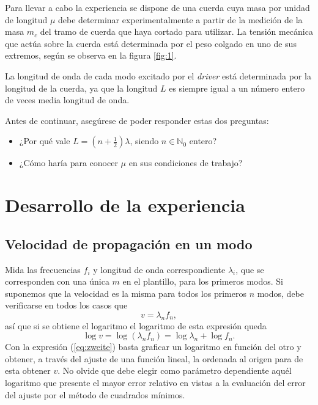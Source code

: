 \documentclass[laboratorio]{guia}
\begin{document}
Para llevar a cabo la experiencia se dispone de una cuerda cuya masa por unidad de longitud \(\mu\) debe determinar experimentalmente a partir de la medición de la masa \(m_c\) del tramo de cuerda que haya cortado para utilizar.
La tensión mecánica que actúa sobre la cuerda está determinada por el peso colgado en uno de sus extremos, según se observa en la figura \ref{fig:1}. 

La longitud de onda de cada modo excitado por el \textit{driver} está determinada por la longitud de la cuerda, ya que la longitud \(L\) es siempre igual a un número entero de veces media longitud de onda.

Antes de continuar, asegúrese de poder responder estas dos preguntas:
\begin{itemize}
    \item ¿Por qué vale \(L = (n+\frac{1}{2}) \lambda\), siendo \(n \in \mathbb{N}_0\) entero? 
    \item ¿Cómo haría para conocer \(\mu\) en sus condiciones de trabajo?
\end{itemize}



\section{Desarrollo de la experiencia}

\subsection{Velocidad de propagación en un modo}
Mida las frecuencias \(f_i\) y longitud de onda correspondiente \(\lambda_i\), que se corresponden con una única \(m\) en el plantillo, para los primeros modos.
Si suponemos que la velocidad es la misma para todos los primeros \(n\) modos, debe verificarse en todos los casos que
\begin{equation}
  v= \lambda_n f_n,
  \label{eq:erste}
\end{equation}
así que si se obtiene el logaritmo el logaritmo de esta expresión queda
\begin{equation}
  \log{v}= \log{\left(\lambda_n f_n \right)}= \log{\lambda_n}+ \log{f_n}.
  \label{eq:zweite}
\end{equation}
Con la expresión (\ref{eq:zweite}) basta graficar un logaritmo en función del otro y obtener, a través del ajuste de una función lineal, la ordenada al origen para de esta obtener \(v\).
No olvide que debe elegir como parámetro dependiente aquél logaritmo que presente el mayor error relativo en vistas a la evaluación del error del ajuste por el método de cuadrados mínimos.
\end{document}
